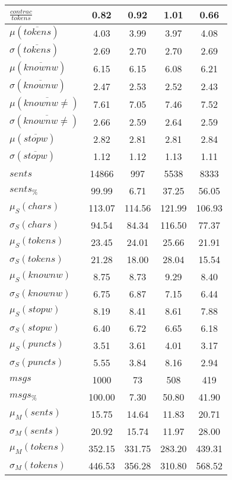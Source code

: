 \begin{table}[h!]
\begin{center}
\begin{tabular}{| l || c | c | c | c |}
$\frac{contrac}{tokens}$ & 0.82  & 0.92  & 1.01  & 0.66 \\\hline\hline
$\mu(\overline{tokens})$ & 4.03  & 3.99  & 3.97  & 4.08 \\
$\sigma(\overline{tokens})$ & 2.69  & 2.70  & 2.70  & 2.69 \\\hline
$\mu(\overline{knownw})$ & 6.15  & 6.15  & 6.08  & 6.21 \\
$\sigma(\overline{knownw})$ & 2.47  & 2.53  & 2.52  & 2.43 \\\hline
$\mu(\overline{knownw \neq})$ & 7.61  & 7.05  & 7.46  & 7.52 \\
$\sigma(\overline{knownw \neq})$ & 2.66  & 2.59  & 2.64  & 2.59 \\\hline
$\mu(\overline{stopw})$ & 2.82  & 2.81  & 2.81  & 2.84 \\
$\sigma(\overline{stopw})$ & 1.12  & 1.12  & 1.13  & 1.11 \\\hline\hline
$sents$ & 14866  & 997  & 5538  & 8333 \\
$sents_{\%}$ & 99.99  & 6.71  & 37.25  & 56.05 \\\hline
$\mu_S(chars)$ & 113.07  & 114.56  & 121.99  & 106.93 \\
$\sigma_S(chars)$ & 94.54  & 84.34  & 116.50  & 77.37 \\\hline
$\mu_S(tokens)$ & 23.45  & 24.01  & 25.66  & 21.91 \\
$\sigma_S(tokens)$ & 21.28  & 18.00  & 28.04  & 15.54 \\\hline
$\mu_S(knownw)$ & 8.75  & 8.73  & 9.29  & 8.40 \\
$\sigma_S(knownw)$ & 6.75  & 6.87  & 7.15  & 6.44 \\\hline
$\mu_S(stopw)$ & 8.19  & 8.41  & 8.61  & 7.88 \\
$\sigma_S(stopw)$ & 6.40  & 6.72  & 6.65  & 6.18 \\\hline
$\mu_S(puncts)$ & 3.51  & 3.61  & 4.01  & 3.17 \\
$\sigma_S(puncts)$ & 5.55  & 3.84  & 8.16  & 2.94 \\\hline\hline
$msgs$ & 1000  & 73  & 508  & 419 \\
$msgs_{\%}$ & 100.00  & 7.30  & 50.80  & 41.90 \\\hline
$\mu_M(sents)$ & 15.75  & 14.64  & 11.83  & 20.71 \\
$\sigma_M(sents)$ & 20.92  & 15.74  & 11.97  & 28.00 \\\hline
$\mu_M(tokens)$ & 352.15  & 331.75  & 283.20  & 439.31 \\
$\sigma_M(tokens)$ & 446.53  & 356.28  & 310.80  & 568.52 \\\hline

\end{tabular}
\end{center}
\end{table}
